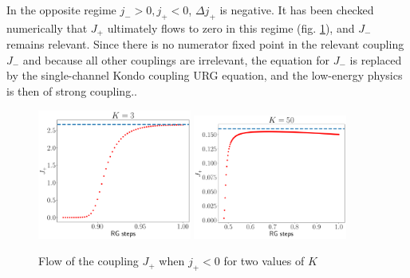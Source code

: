 \documentclass[12pt]{revtex4-2}
\begin{document}
In the opposite regime \(j_- > 0, j_+ < 0\), \(\Delta j_+\) is negative. It has been checked numerically that \(J_+\) ultimately flows to zero in this regime (fig. \ref{irrel_Jplus}), and \(J_-\) remains relevant. Since there is no numerator fixed point in the relevant coupling \(J_-\) and because all other couplings are irrelevant, the equation for \(J_-\) is replaced by the single-channel Kondo coupling URG equation, and the low-energy physics is then of strong coupling..
\begin{figure}[htpb]
	\centering
	\includegraphics[width=0.45\textwidth]{../numerics/irr_Jp_K=3.pdf}
	\includegraphics[width=0.45\textwidth]{../numerics/irr_Jp_K=50.pdf}
	\caption{Flow of the coupling \(J_+\) when \(j_+ < 0\) for two values of \(K\)}
	\label{irrel_Jplus}
\end{figure}
\end{document}
